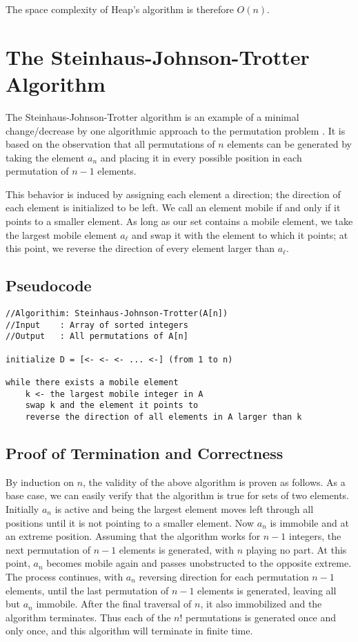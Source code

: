 \documentclass[10pt, oneside]{article}   	%
\begin{document}
The space complexity of Heap's algorithm is therefore $O(n)$.

\section{The Steinhaus-Johnson-Trotter Algorithm}
\newtheorem{axiom}{Axiom}[section]
\newtheorem{lemma}{Lemma}[section]

The Steinhaus-Johnson-Trotter algorithm is an example of a minimal change/decrease by one algorithmic approach to the permutation problem \cite{johnson}. It is based on the observation that all permutations of $n$ elements can be generated by taking the element $a_{n}$ and placing it in every possible position in each permutation of $n - 1$ elements.

This behavior is induced by assigning each element a direction; the direction of each element is initialized to be left. We call an element mobile if and only if it points to a smaller element. As long as our set contains a mobile element, we take the largest mobile element $a_{\ell}$ and swap it with the element to which it points; at this point, we reverse the direction of every element larger than $a_{\ell}$.

\subsection{Pseudocode}
\begin{verbatim}
//Algorithim: Steinhaus-Johnson-Trotter(A[n])
//Input    : Array of sorted integers
//Output   : All permutations of A[n]
 
initialize D = [<- <- <- ... <-] (from 1 to n)
 
while there exists a mobile element
    k <- the largest mobile integer in A
    swap k and the element it points to
    reverse the direction of all elements in A larger than k
\end{verbatim}

\subsection{Proof of Termination and Correctness}

By induction on $n$, the validity of the above algorithm is proven as follows. As a base case, we can easily verify that the algorithm is true for sets of two elements. Initially $a_{n}$ is active and being the largest element moves left through all positions until it is not pointing to a smaller element. Now $a_{n}$ is immobile and at an extreme position. Assuming that the algorithm works for $n-1$ integers, the next permutation of $n - 1$ elements is generated, with $n$ playing no part. At this point, $a_{n}$ becomes mobile again and passes unobstructed to the opposite extreme. The process continues, with $a_{n}$ reversing direction for each permutation $n- 1$ elements, until the last permutation of $n-1$ elements is generated, leaving all but $a_{n}$ immobile. After the final traversal of $n$, it also immobilized and the algorithm terminates. Thus each of the $n!$ permutations is generated once and only once, and this algorithm will terminate in finite time.
\end{document}
